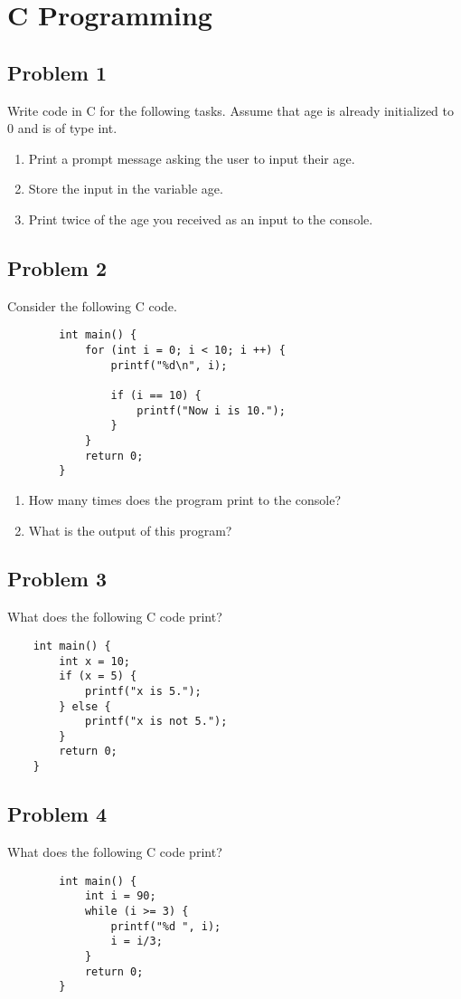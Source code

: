 \documentclass{article}
\begin{document}
\section*{C Programming}
\subsection*{Problem 1}
    Write code in C for the following tasks. Assume that age is already initialized to 0 and is of type int.
        \begin{enumerate}[label=\alph*.]
            \item Print a prompt message asking the user to input their age.
            \item Store the input in the variable age. 
            \item Print twice of the age you received as an input to the console.
        \end{enumerate}
        
\subsection*{Problem 2}
    Consider the following C code.
    \begin{verbatim}
        int main() {
            for (int i = 0; i < 10; i ++) {
                printf("%d\n", i);

                if (i == 10) {
                    printf("Now i is 10.");
                }
            }
            return 0;
        }
    \end{verbatim}

    \begin{enumerate}[label=\alph*.]
        \item How many times does the program print to the console?
        \item What is the output of this program?
    \end{enumerate}

\subsection*{Problem 3}
    What does the following C code print?

    \begin{verbatim}
    int main() {
        int x = 10;
        if (x = 5) {
            printf("x is 5.");
        } else {
            printf("x is not 5.");
        }
        return 0;
    }
    \end{verbatim}

\subsection*{Problem 4}
    What does the following C code print?
    
    \begin{verbatim}
        int main() {
            int i = 90;
            while (i >= 3) {
                printf("%d ", i);
                i = i/3;
            }
            return 0;
        }
    \end{verbatim}
\end{document}

